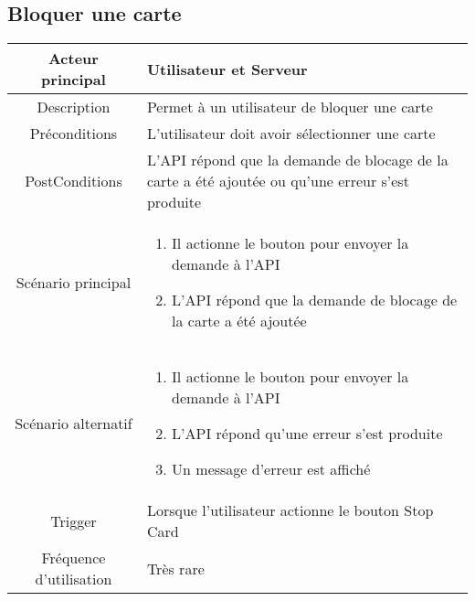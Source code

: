 \documentclass{article}
\begin{document}
    \newpage

\subsection{Bloquer une carte}
    \begin{table}[h]
        \begin{tabular}{|c|p{10cm}|}
        \hline
        Acteur principal& Utilisateur et Serveur    \\
        \hline
        Description&  Permet à un utilisateur de bloquer une carte  \\
        \hline
        Préconditions&    L'utilisateur doit avoir sélectionner une carte  \\
        \hline
        PostConditions&  L'API répond que la demande de blocage de la carte a été ajoutée ou qu'une erreur s'est produite    \\
        \hline
        Scénario principal& 
                \begin{enumerate}
                    \item Il actionne le bouton pour envoyer la demande à l'API
                    \item L'API répond que la demande de blocage de la carte a été ajoutée
                \end{enumerate}     \\
        \hline
        Scénario alternatif&  
        \begin{enumerate}
            \item Il actionne le bouton pour envoyer la demande à l'API
            \item L'API répond qu'une erreur s'est produite
            \item Un message d'erreur est affiché
        \end{enumerate}    \\
        \hline
        Trigger&   Lorsque l'utilisateur actionne le bouton Stop Card   \\
        \hline
        Fréquence d'utilisation&    Très rare  \\
        \hline
        \end{tabular}
    \end{table}

\newpage
\end{document}
